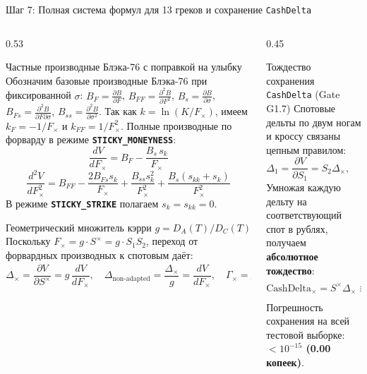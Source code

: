\documentclass[aspectratio=169, 9pt]{beamer}
\begin{document}
\begin{frame}{Шаг 7: Полная система формул для 13 греков и сохранение \texttt{CashDelta}}
  \begin{columns}[T]
    \begin{column}{0.53\textwidth}
      \begin{block}{Частные производные Блэка-76 с поправкой на улыбку}
        Обозначим базовые производные Блэка-76 при фиксированной $\sigma$:
        $B_F = \frac{\partial B}{\partial F}$, $B_{FF} = \frac{\partial^2 B}{\partial F^2}$, $B_s = \frac{\partial B}{\partial \sigma}$, $B_{Fs} = \frac{\partial^2 B}{\partial F \partial \sigma}$, $B_{ss} = \frac{\partial^2 B}{\partial \sigma^2}$.
        Так как $k = \ln(K / F_\times)$, имеем $k_F = -1/F_\times$ и $k_{FF} = 1/F_\times^2$. Полные производные по форварду в режиме \textbf{\texttt{STICKY\_MONEYNESS}}:
        $$\frac{dV}{dF_\times} = B_F - \frac{B_s\, s_k}{F_\times}$$
        $$\frac{d^2V}{dF_\times^2} = B_{FF} - \frac{2 B_{Fs} s_k}{F_\times} + \frac{B_{ss} s_k^2}{F_\times^2} + \frac{B_s (s_{kk} + s_k)}{F_\times^2}$$
        В режиме \textbf{\texttt{STICKY\_STRIKE}} полагаем $s_k = s_{kk} = 0$.
      \end{block}

      \begin{block}{Геометрический множитель кэрри $g = D_A(T) / D_C(T)$}
        Поскольку $F_\times = g \cdot S^\times = g \cdot S_1 S_2$, переход от форвардных производных к спотовым даёт:
        $$\Delta_\times = \frac{\partial V}{\partial S^\times} = g\,\frac{dV}{dF_\times}, \quad
          \Delta_{\text{non-adapted}} = \frac{\Delta_\times}{g} = \frac{dV}{dF_\times}, \quad
          \Gamma_\times = g^2\,\frac{d^2V}{dF_\times^2}$$
      \end{block}
    \end{column}

    \begin{column}{0.45\textwidth}
      \begin{exampleblock}{Тождество сохранения \texttt{CashDelta} (Gate G1.7)}
        Спотовые дельты по двум ногам и кроссу связаны цепным правилом:
        $$\Delta_1 = \frac{\partial V}{\partial S_1} = S_2 \Delta_\times, \qquad \Delta_2 = \frac{\partial V}{\partial S_2} = S_1 \Delta_\times$$
        Умножая каждую дельту на соответствующий спот в рублях, получаем \textbf{абсолютное тождество}:
        $$\text{CashDelta}_\times = S^\times \Delta_\times \equiv S_1 \Delta_1 \equiv S_2 \Delta_2 = F_\times \frac{dV}{dF_\times}$$
        Погрешность сохранения на всей тестовой выборке: \textbf{$< 10^{-15}$ (0.00 копеек)}.
      \end{exampleblock}


\end{column}
\end{columns}
\end{frame}
\end{document}
